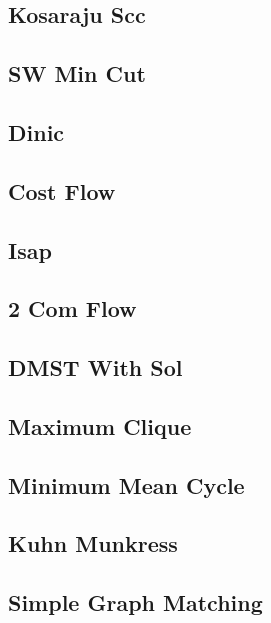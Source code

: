 \subsection{Kosaraju Scc}

\subsection{SW Min Cut}

\subsection{Dinic}

\subsection{Cost Flow}

\subsection{Isap}

\subsection{2 Com Flow}

\subsection{DMST With Sol}

\subsection{Maximum Clique}

\subsection{Minimum Mean Cycle}

\subsection{Kuhn Munkress}

\subsection{Simple Graph Matching}

